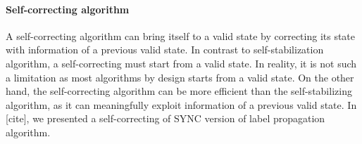 \paragraph{Self-correcting algorithm}

A self-correcting algorithm can bring itself to a valid state by correcting
its state with information of a previous valid state. In contrast
to self-stabilization algorithm, a self-correcting must start from
a valid state. In reality, it is not such a limitation as most algorithms
by design starts from a valid state. On the other hand, the self-correcting
algorithm can be more efficient than the self-stabilizing algorithm,
as it can meaningfully exploit information of a previous valid state.
In {[}cite{]}, we presented a self-correcting of SYNC version of label
propagation algorithm. 


